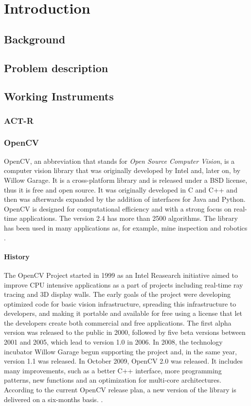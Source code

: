 \chapter{Introduction}
\section{Background}
\section{Problem description}
\section{Working Instruments}
\subsection{ACT-R}
\subsection{OpenCV}
	OpenCV, an abbreviation that stands for \emph{Open Source Computer Vision}, is a computer vision library that was originally developed by Intel and, later on, by Willow Garage.
	It is a cross-platform library and is released under a BSD license, thus it is free and open source. It was originally developed in C and C++ and then was afterwards expanded by the addition of interfaces for Java and Python. OpenCV is designed for computational efficiency and with a strong focus on real-time applications. The version 2.4 has more than 2500 algorithms. The library has been used in many applications as, for example, mine inspection and robotics \cite{OpenCV:MainWebPage}.
	
	
	\subsubsection*{History}
	The OpenCV Project started in 1999 as an Intel Reasearch initiative aimed to improve CPU intensive applications as a part of projects including real-time ray tracing and 3D display walls. The early goals of the project were developing optimized code for basic vision infrastructure, spreading this infrastructure to developers, and making it portable and available for free using a license that let the developers create both commercial and free applications.
	The first alpha version was released to the public in 2000, followed by five beta versions between 2001 and 2005, which lead to version 1.0 in 2006. In 2008, the technology incubator Willow Garage begun supporting the project and, in the same year, version 1.1  was released. 
	In October 2009, OpenCV 2.0 was released. It includes many improvements, such as a better C++ interface, more programming patterns, new functions and an optimization for multi-core architectures. According to the current OpenCV release plan, a new version of the library is delivered on a six-months basis. \cite{OpenCV:ChangeLogs}.
	
